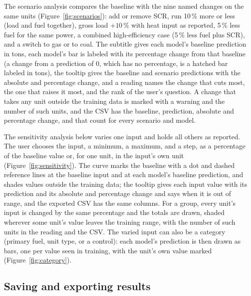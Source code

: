 \documentclass[11pt,a4paper]{article}
\begin{document}
The scenario analysis compares the baseline with the nine named changes on the same units
(Figure~\ref{fig:scenarios}): add or remove SCR, run 10\,\% more or less (load and fuel together),
gross load $+10\,\%$ with heat input as reported, 5\,\% less fuel for the same power, a combined
high-efficiency case (5\,\% less fuel plus SCR), and a switch to gas or to coal. The subtitle
gives each model's baseline prediction in tons, each model's bar is labeled with its percentage
change from that baseline (a change from a prediction of 0, which has no percentage, is a hatched
bar labeled in tons), the tooltip gives the baseline and scenario predictions with the
absolute and percentage change, and a reading names the change that cuts \NOx{} most, the one
that raises it most, and the rank of the user's question. A change that takes any unit outside
the training data is marked with a warning and the number of such units, and the CSV has the
baseline, prediction, absolute and percentage change, and that count for every scenario and
model.

The sensitivity analysis below varies one input and holds all others as reported. The user
chooses the input, a minimum, a maximum, and a step, as a percentage of the baseline value or,
for one unit, in the input's own unit (Figure~\ref{fig:sensitivity}). The curve marks the
baseline with a dot and dashed reference lines at the baseline input and at each model's baseline
prediction, and shades values outside the training data; the tooltip gives each input value
with its prediction and its absolute and percentage change and says when it is out of range, and
the exported CSV has the same columns. For a group, every unit's input is changed by the same
percentage and the totals are drawn, shaded wherever some unit's value leaves the training
range, with the number of such units in the reading and the CSV. The varied input can also be a category (primary fuel, unit type, or a \NOx{} control):
each model's prediction is then drawn as bars, one per value seen in training, with the unit's
own value marked (Figure~\ref{fig:category}).

\subsection{Saving and exporting results}
\label{sec:exports}
\end{document}

